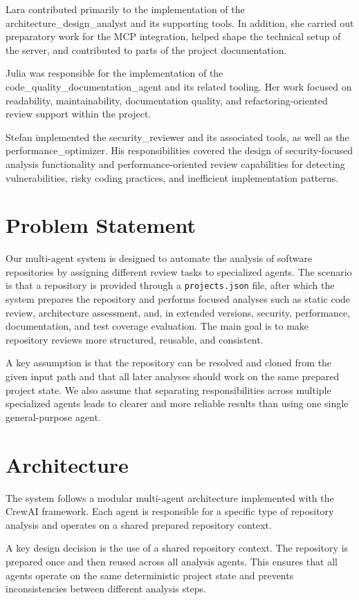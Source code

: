 \documentclass[conference]{IEEEtran}
\begin{document}
Lara contributed primarily to the implementation of the architecture\_design\_analyst and its supporting tools. In addition, she carried out preparatory work for the MCP integration, helped shape the technical setup of the server, and contributed to parts of the project documentation.

Julia was responsible for the implementation of the code\_quality\_documentation\_agent and its related tooling. Her work focused on readability, maintainability, documentation quality, and refactoring-oriented review support within the project.

Stefan implemented the security\_reviewer and its associated tools, as well as the performance\_optimizer. His responsibilities covered the design of security-focused analysis functionality and performance-oriented review capabilities for detecting vulnerabilities, risky coding practices, and inefficient implementation patterns.

\section{Problem Statement}
Our multi-agent system is designed to automate the analysis of software repositories by assigning different review tasks to specialized agents. The scenario is that a repository is provided through a \texttt{projects.json} file, after which the system prepares the repository and performs focused analyses such as static code review, architecture assessment, and, in extended versions, security, performance, documentation, and test coverage evaluation. The main goal is to make repository reviews more structured, reusable, and consistent.

A key assumption is that the repository can be resolved and cloned from the given input path and that all later analyses should work on the same prepared project state. We also assume that separating responsibilities across multiple specialized agents leads to clearer and more reliable results than using one single general-purpose agent.

\section{Architecture}
The system follows a modular multi-agent architecture implemented with the CrewAI framework. Each agent is responsible for a specific type of repository analysis and operates on a shared prepared repository context.

A key design decision is the use of a shared repository context. The repository is prepared once and then reused across all analysis agents. This ensures that all agents operate on the same deterministic project state and prevents inconsistencies between different analysis steps.
\end{document}

